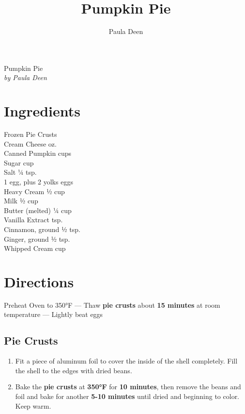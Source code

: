 \documentclass[11pt,letterpaper]{article}
\title{Pumpkin Pie}
\author{Paula Deen}
\date{}
\begin{document}
\thispagestyle{empty}

\begin{center}
\huge{Pumpkin Pie} 
\normalsize
\\
\textit{by Paula Deen}
\end{center}


\section*{Ingredients}
\setlength{\columnsep}{20pt}
\begin{multicols}{2}
\noindent
    Frozen Pie Crusts  \\
    Cream Cheese  oz. \\
    Canned Pumpkin  cups \\
    Sugar  cup \\
	Salt \dotfill ¼ tsp. \\
	1 egg, plus 2 yolks  eggs  \\ 
	\columnbreak
	Heavy Cream \dotfill ½ cup \\
	Milk \dotfill ½ cup \\
	Butter (melted) \dotfill ¼ cup \\
	Vanilla Extract  tsp. \\
	Cinnamon, ground \dotfill ½ tsp. \\
	Ginger, ground \dotfill ½ tsp. \\
	Whipped Cream  cup \\
\end{multicols}

\section*{Directions}

\noindent
Preheat Oven to 350°F ---
Thaw \textbf{pie crusts} about \textbf{15 minutes} at room temperature ---
Lightly beat eggs
\subsection*{Pie Crusts}

\begin{enumerate}
	\item Fit a piece of aluminum foil to cover the inside of the shell completely. Fill the shell to the edges with dried beans.
	\item Bake the \textbf{pie crusts} at \textbf{350°F} for \textbf{10 minutes}, then remove the beans and foil and bake for another \textbf{5-10 minutes} until dried and beginning to color. Keep warm.
\end{enumerate}
\end{document}
